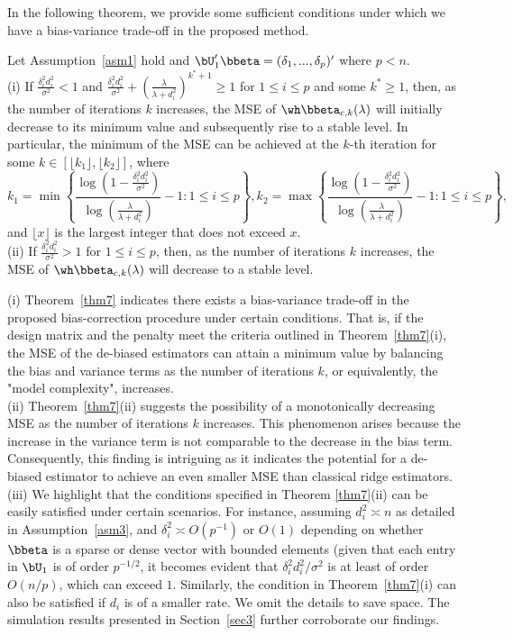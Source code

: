 In the following theorem, we provide some sufficient conditions under which we have a bias-variance trade-off in the proposed method.
\begin{theorem}\label{thm7}
Let Assumption~\ref{asm1} hold and $\bU_1'\bbeta=(\delta_1,...,\delta_p)'$ where $p<n$.\\
    (i) If $\frac{\delta_i^2d_i^2}{\sigma^2}<1$ and $\frac{\delta_i^2d_i^2}{\sigma^2}+(\frac{\lambda}{\lambda+d_i^2})^{k^*+1}\geq 1$ for $1\leq i\leq p$ and some $k^*\geq 1$, then, as the number of iterations $k$ increases, the MSE of $\wh\bbeta_{c,k}(\lambda)$ will initially decrease to its minimum value and subsequently rise to a stable level. In particular, the minimum of the MSE can be achieved at the $k$-th iteration for some $k\in [\lfloor k_1 \rfloor,\lfloor k_2\rfloor]$, where
    \[k_1=\min\left\{\frac{\log(1-\frac{\delta_i^2d_i^2}{\sigma^2})}{\log(\frac{\lambda}{\lambda+d_i^2})}-1:1\leq i\leq p\right\},k_2=\max\left\{\frac{\log(1-\frac{\delta_i^2d_i^2}{\sigma^2})}{\log(\frac{\lambda}{\lambda+d_i^2})}-1:1\leq i\leq p\right\},\]
and $\lfloor x\rfloor$ is the largest integer that does not exceed $x$.\\
    (ii) If $\frac{\delta_i^2d_i^2}{\sigma^2}>1$ for $1\leq i\leq p$, then, as the number of iterations $k$ increases, the MSE of $\wh\bbeta_{c,k}(\lambda)$ will decrease to a stable level.
\end{theorem}
\begin{remark}
    (i) Theorem~\ref{thm7} indicates there exists a bias-variance trade-off in the proposed bias-correction procedure under certain conditions. That is, if the design matrix and the penalty meet the criteria outlined in Theorem~\ref{thm7}(i), the MSE of the de-biased estimators can attain a minimum value by balancing the bias and variance terms as the number of iterations $k$, or equivalently, the "model complexity", increases.\\
    (ii) Theorem~\ref{thm7}(ii) suggests the possibility of a monotonically decreasing MSE as the number of iterations $k$ increases. This phenomenon arises because the increase in the variance term is not comparable to the decrease in the bias term. Consequently, this finding is intriguing as it indicates the potential for a de-biased estimator to achieve an even smaller MSE than classical ridge estimators.\\
    (iii) We highlight that the conditions specified in Theorem \ref{thm7}(ii) can be easily satisfied under certain scenarios. For instance, assuming $d_i^2\asymp {n}$ as detailed in Assumption~\ref{asm3}, and $\delta_i^2\asymp O(p^{-1})$ or $O(1)$ depending on whether $\bbeta$ is a sparse or dense vector with bounded elements (given that each entry in $\bU_1$ is of order $p^{-1/2}$, it becomes evident that $\delta_i^2d_i^2/\sigma^2$ is at least of order $O(n/p)$, which can exceed $1$. Similarly, the condition in Theorem~\ref{thm7}(i) can also be satisfied if $d_i$ is of a smaller rate. We omit the details to save space. 
The simulation results presented in Section~\ref{sec3} further corroborate our findings.
    
\end{remark}
